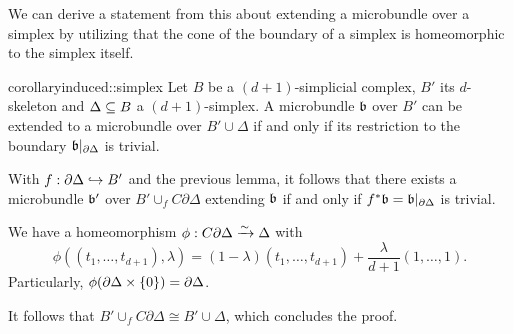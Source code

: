 \begin{myparagraph}
    We can derive a statement from this about extending a microbundle over a simplex
    by utilizing that the cone of the boundary of a simplex 
    is homeomorphic to the simplex itself.
\end{myparagraph}

\begin{mystatement}{corollary}{induced::simplex}
    Let $B$ be a $(d + 1)$-simplicial complex, $B'$ its $d$-skeleton and $\Delta \subseteq{} B$ a $(d + 1)$-simplex.
    A microbundle $\bb$ over $B'$ can be extended to a microbundle over $B' \cup \Delta$
    if and only if its restriction to the boundary $\bb[\partial \Delta]$ is trivial.
\end{mystatement}

\begin{myproof}
    With $f: \partial \Delta \hookrightarrow{} B'$ and the previous lemma,
    it follows that there exists a microbundle $\bb'$ over $B' \cup_f C\partial\Delta$ extending $\bb$
    if and only if $\ind{f}\bb = \bb[\partial\Delta]$ is trivial.

    We have a homeomorphism $\phi: C\partial \Delta \xrightarrow{\sim} \Delta$ with
    \[ \phi((t_1, \dots, t_{d + 1}), \lambda) = (1 - \lambda) (t_1, \dots, t_{d + 1}) + \frac{\lambda}{d + 1} (1, \dots, 1). \]
    Particularly, $\phi(\partial \Delta \times \{0\}) = \partial \Delta$.

    It follows that $B' \cup_f C \partial\Delta \cong B' \cup \Delta$, which concludes the proof.
\end{myproof}